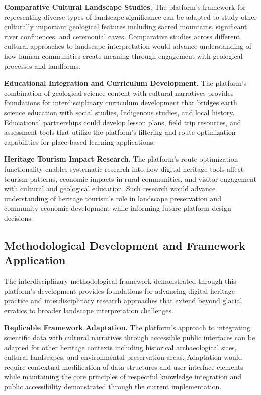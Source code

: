 \textbf{Comparative Cultural Landscape Studies.} The platform's framework for representing diverse types of landscape significance can be adapted to study other culturally important geological features including sacred mountains, significant river confluences, and ceremonial caves. Comparative studies across different cultural approaches to landscape interpretation would advance understanding of how human communities create meaning through engagement with geological processes and landforms.

\textbf{Educational Integration and Curriculum Development.} The platform's combination of geological science content with cultural narratives provides foundations for interdisciplinary curriculum development that bridges earth science education with social studies, Indigenous studies, and local history. Educational partnerships could develop lesson plans, field trip resources, and assessment tools that utilize the platform's filtering and route optimization capabilities for place-based learning applications.

\textbf{Heritage Tourism Impact Research.} The platform's route optimization functionality enables systematic research into how digital heritage tools affect tourism patterns, economic impacts in rural communities, and visitor engagement with cultural and geological education. Such research would advance understanding of heritage tourism's role in landscape preservation and community economic development while informing future platform design decisions.

\subsection{Methodological Development and Framework Application}
\label{subsec:methodological_development}

The interdisciplinary methodological framework demonstrated through this platform's development provides foundations for advancing digital heritage practice and interdisciplinary research approaches that extend beyond glacial erratics to broader landscape interpretation challenges.

\textbf{Replicable Framework Adaptation.} The platform's approach to integrating scientific data with cultural narratives through accessible public interfaces can be adapted for other heritage contexts including historical archaeological sites, cultural landscapes, and environmental preservation areas. Adaptation would require contextual modification of data structures and user interface elements while maintaining the core principles of respectful knowledge integration and public accessibility demonstrated through the current implementation.

